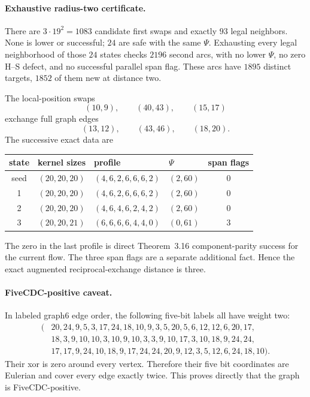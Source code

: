 \documentclass[11pt]{article}
\theoremstyle{definition}
\theoremstyle{remark}
\numberwithin{equation}{section}
\begin{document}
\paragraph{Exhaustive radius-two certificate.}
There are \(3\cdot19^2=1083\) candidate first swaps and exactly \(93\)
legal neighbors.  None is lower or successful; \(24\) are safe with the
same \(\Psi\).  Exhausting every legal neighborhood of those \(24\)
states checks \(2196\) second arcs, with no lower \(\Psi\), no zero
H--S defect, and no successful parallel span flag.  These arcs have
\(1895\) distinct targets, \(1852\) of them new at distance two.

The local-position swaps
\[
                    (10,9),\qquad(40,43),\qquad(15,17)
\]
exchange full graph edges
\[
                    (13,12),\qquad(43,46),\qquad(18,20).
\]
The successive exact data are
\begin{center}
\small
\begin{tabular}{@{}ccllc@{}}
\toprule
state & kernel sizes & profile & \(\Psi\) & span flags\\
\midrule
seed & \((20,20,20)\) & \((4,6,2,6,6,6,2)\) & \((2,60)\) & 0\\
1 & \((20,20,20)\) & \((4,6,2,6,6,6,2)\) & \((2,60)\) & 0\\
2 & \((20,20,20)\) & \((4,6,4,6,2,4,2)\) & \((2,60)\) & 0\\
3 & \((20,20,21)\) & \((6,6,6,6,4,4,0)\) & \((0,61)\) & 3\\
\bottomrule
\end{tabular}
\end{center}
The zero in the last profile is direct Theorem~3.16 component-parity
success for the current flow.  The three span flags are a separate
additional fact.  Hence the exact augmented reciprocal-exchange
distance is three.

\paragraph{FiveCDC-positive caveat.}
In labeled graph6 edge order, the following five-bit labels all have
weight two:
\begin{equation}
\begin{split}
(&20,24,9,5,3,17,24,18,10,9,3,5,20,5,6,12,12,6,20,17,\\
 &18,3,9,10,10,3,10,9,10,3,3,9,10,17,3,10,18,9,24,24,\\
 &17,17,9,24,10,18,9,17,24,24,20,9,12,3,5,12,6,24,18,10).
\end{split}
\end{equation}
Their xor is zero around every vertex.  Therefore their five bit
coordinates are Eulerian and cover every edge exactly twice.  This
proves directly that the graph is FiveCDC-positive.
\end{document}
